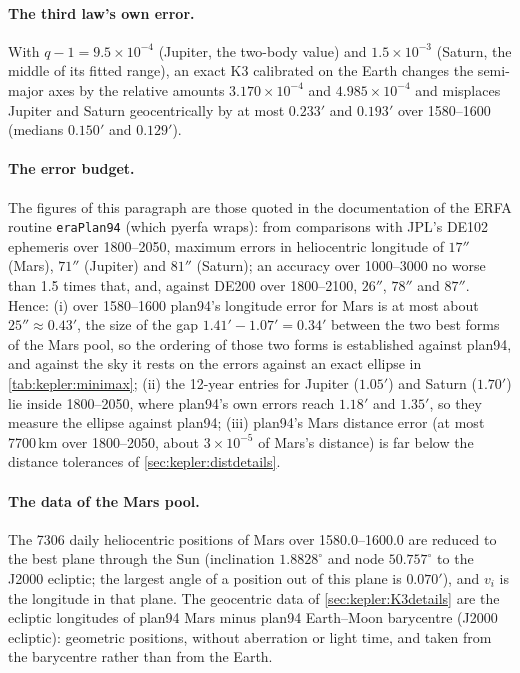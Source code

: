 \paragraph{The third law's own error.} With $q-1=9.5\times10^{-4}$ (Jupiter, the two-body value) and $1.5\times10^{-3}$ (Saturn, the middle of its fitted range), an exact $\mathrm{K3}$ calibrated on the Earth changes the semi-major axes by the relative amounts $3.170\times10^{-4}$ and $4.985\times10^{-4}$ and misplaces Jupiter and Saturn geocentrically by at most $0.233'$ and $0.193'$ over 1580--1600 (medians $0.150'$ and $0.129'$).

\paragraph{The error budget.} The figures of this paragraph are those quoted in the documentation of the ERFA routine \texttt{eraPlan94} (which pyerfa wraps): from comparisons with JPL's DE102 ephemeris over 1800--2050, maximum errors in heliocentric longitude of $17''$ (Mars), $71''$ (Jupiter) and $81''$ (Saturn); an accuracy over 1000--3000 no worse than 1.5 times that, and, against DE200 over 1800--2100, $26''$, $78''$ and $87''$. Hence: (i) over 1580--1600 plan94's longitude error for Mars is at most about $25''\approx0.43'$, the size of the gap $1.41'-1.07'=0.34'$ between the two best forms of the Mars pool, so the ordering of those two forms is established against plan94, and against the sky it rests on the errors against an exact ellipse in \cref{tab:kepler:minimax}; (ii) the 12-year entries for Jupiter ($1.05'$) and Saturn ($1.70'$) lie inside 1800--2050, where plan94's own errors reach $1.18'$ and $1.35'$, so they measure the ellipse against plan94; (iii) plan94's Mars distance error (at most 7700\,km over 1800--2050, about $3\times10^{-5}$ of Mars's distance) is far below the distance tolerances of \cref{sec:kepler:distdetails}.

\paragraph{The data of the Mars pool.} The 7306 daily heliocentric positions of Mars over 1580.0--1600.0 are reduced to the best plane through the Sun (inclination $1.8828^\circ$ and node $50.757^\circ$ to the J2000 ecliptic; the largest angle of a position out of this plane is $0.070'$), and $v_i$ is the longitude in that plane. The geocentric data of \cref{sec:kepler:K3details} are the ecliptic longitudes of plan94 Mars minus plan94 Earth--Moon barycentre (J2000 ecliptic): geometric positions, without aberration or light time, and taken from the barycentre rather than from the Earth.

